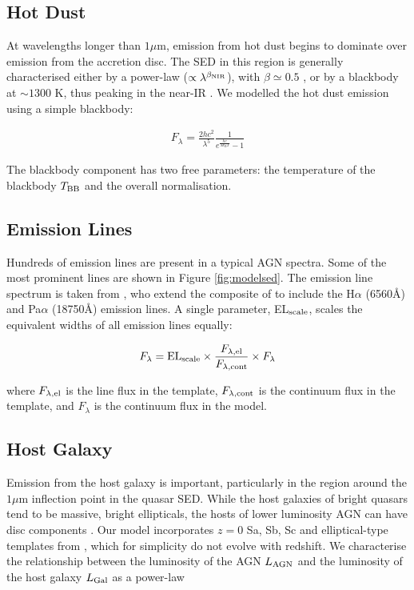 \subsection{Hot Dust}

At wavelengths longer than $1\mu$m, emission from hot dust begins to dominate over emission from the accretion disc. The SED in this region is generally characterised either by a power-law ($\propto \lambda^{\beta_{\rm NIR}}$), with $\beta \simeq 0.5$ \citep[e.g.][]{richards06, zhang14}, or by a blackbody at $\sim 1300$ K, thus peaking in the near-IR \citep[e.g.][]{leipski14}. We modelled the hot dust emission using a simple blackbody:

\begin{eqnarray}  
  F_\lambda =\frac{2 hc^2}{\lambda^5}\frac{1}{ e^{\frac{hc}{\lambda k_\mathrm{B}T}} - 1} 
\end{eqnarray}

The blackbody component has two free parameters: the temperature of the blackbody $T_{\rm BB}$ and the overall normalisation. 
 
\subsection{Emission Lines}

Hundreds of emission lines are present in a typical AGN spectra. Some of the most prominent lines are shown in Figure \ref{fig:modelsed}. The emission line spectrum is taken from \citet{maddox06}, who extend the composite of \citet{francis91} to include the H$\alpha$ (6560\AA) and Pa$\alpha$ (18750\AA) emission lines. A single parameter, EL$_{\rm scale}$, scales the equivalent widths of all emission lines equally:

\begin{eqnarray}
  F_{\lambda} =  {\rm EL}_{\rm scale} \times \frac{F_{\lambda, \rm el}}{F_{\lambda, \rm cont}} \times F_{\lambda} 
\end{eqnarray} 

where $F_{\lambda, \rm el}$ is the line flux in the template, $F_{\lambda,\rm cont}$ is the continuum flux in the template, and $F_{\lambda}$ is the continuum flux in the model.  

\subsection{Host Galaxy}

Emission from the host galaxy is important, particularly in the region around the $1\mu$m inflection point in the quasar SED. While the host galaxies of bright quasars tend to be massive, bright ellipticals, the hosts of lower luminosity AGN can have disc components \citep[e.g.][]{dunlop03}. Our model incorporates $z=0$ Sa, Sb, Sc and elliptical-type templates from \citet{mannucci01}, which for simplicity do not evolve with redshift. We characterise the relationship between the luminosity of the AGN $L_{\rm AGN}$ and the luminosity of the host galaxy $L_{\rm Gal}$ as a power-law

